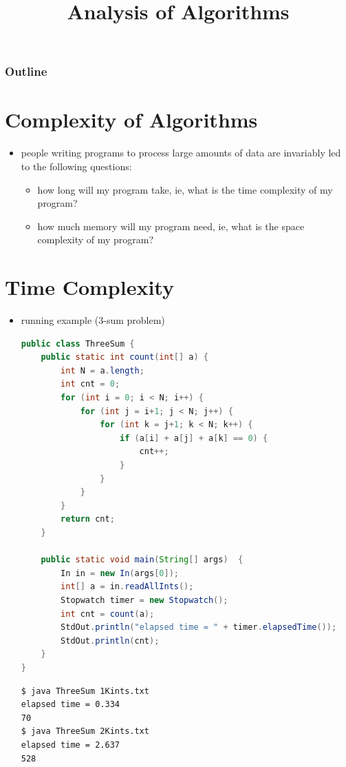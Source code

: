\documentclass[8pt,a4paper,compress]{beamer}
\title{Analysis of Algorithms}
\date{}
\begin{document}
\begin{frame}
\vfill
\titlepage
\end{frame}

\begin{frame}
\frametitle{Outline}
\tableofcontents
\end{frame}

\section{Complexity of Algorithms}
\begin{frame}[fragile]
\begin{itemize}
\item people writing programs to process large amounts of data are invariably led to the following questions:
\begin{itemize}
\item how long will my program take, ie, what is the time complexity of my program?
\item how much memory will my program need, ie, what is the space complexity of my program?
\end{itemize}
\end{itemize}
\end{frame}

\section{Time Complexity}
\begin{frame}[fragile]
\begin{itemize}
\item running example (3-sum problem)
\begin{lstlisting}[language=Java]
public class ThreeSum {
    public static int count(int[] a) {
        int N = a.length;
        int cnt = 0;
        for (int i = 0; i < N; i++) {
            for (int j = i+1; j < N; j++) {
                for (int k = j+1; k < N; k++) {
                    if (a[i] + a[j] + a[k] == 0) {
                        cnt++;
                    }
                }
            }
        }
        return cnt;
    }
    
    public static void main(String[] args)  { 
        In in = new In(args[0]);
        int[] a = in.readAllInts();
        Stopwatch timer = new Stopwatch();
        int cnt = count(a);
        StdOut.println("elapsed time = " + timer.elapsedTime());
        StdOut.println(cnt);
    } 
}
\end{lstlisting}

\begin{lstlisting}[language={}]
$ java ThreeSum 1Kints.txt 
elapsed time = 0.334
70
$ java ThreeSum 2Kints.txt 
elapsed time = 2.637
528
\end{lstlisting}
\end{itemize}
\end{frame}
\end{document}
